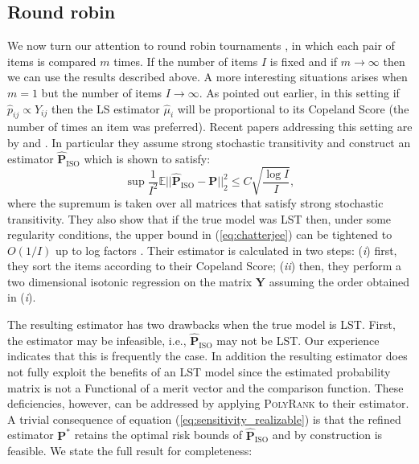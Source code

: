 \documentclass[twoside,11pt]{article}
\begin{document}
\subsection{Round robin} We now turn our attention to round robin tournaments \citep{chatterjee,shah,simons}, in which each pair of items is compared $m$ times. If the number of items $I$ is fixed and if $m \to \infty$ then we can use the results described above. A more interesting situations arises when $m=1$ but the number of items $I \to \infty$. As pointed out earlier, in this setting if  $\hat{p}_{ij} \propto Y_{ij}$ then the LS estimator $\hat{\mu}_i$ will be proportional to its Copeland Score (the number of times an item was preferred). Recent papers addressing this setting are by \citet{chatterjee} and \citet{shah}. In particular  they  assume strong stochastic transitivity and construct an estimator $\boldsymbol{\hat P}_{\text{ISO}}$ which is shown to satisfy: 
\begin{equation}
\label{eq:chatterjee}
	\sup \frac{1}{I^2} \mathbb{E} ||\boldsymbol{\hat P}_{\text{ISO}} - \boldsymbol{P} ||_2^2 \leq C    \sqrt{\frac{\log I}{I}},
\end{equation}
where the supremum is taken over all matrices that satisfy strong stochastic transitivity. They also show that if the true model was LST then, under some regularity conditions, the upper bound in (\ref{eq:chatterjee}) can be tightened to $O(1/I)$ up to log factors \citep{shah}. Their estimator is calculated in  two steps: (\textit{i}) first, they sort the items according to their Copeland Score; (\textit{ii}) then, they perform a two dimensional isotonic regression on the matrix $\boldsymbol{Y}$ assuming the order obtained in (\textit{i}). 

The resulting estimator has two drawbacks when the true model is LST. First, the estimator may be infeasible, i.e., $\boldsymbol{\hat P}_{\text{ISO}}$ may not be LST. Our experience indicates that this is frequently the case. In addition the resulting estimator does not fully exploit the benefits of an LST model since the estimated probability matrix is not a Functional of a merit vector and the comparison function. These deficiencies, however, can be addressed by applying \textsc{PolyRank} to their estimator. A trivial consequence of equation (\ref{eq:sensitivity_realizable}) is that the refined estimator $\boldsymbol{P}^*$ retains the optimal risk bounds of $\boldsymbol{\hat{P}}_{\text{ISO}}$ and by construction is feasible. We state the full result for completeness:
\end{document}
